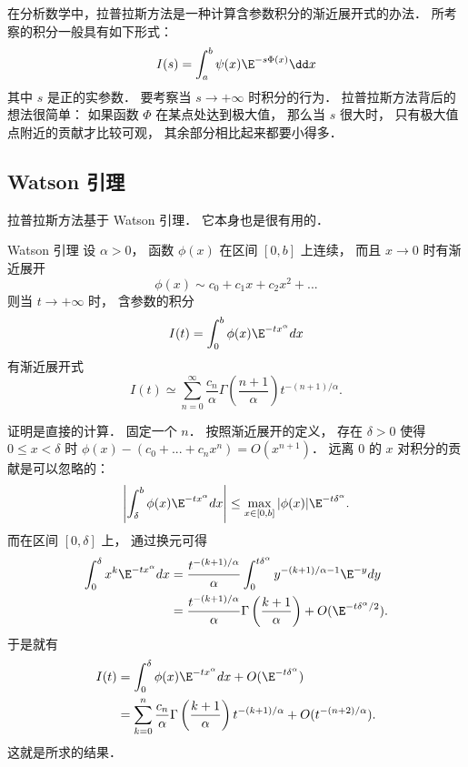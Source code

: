

在分析数学中，拉普拉斯方法是一种计算含参数积分的渐近展开式的办法． 所考察的积分一般具有如下形式：
\begin{equation}\label{LapAsm_eq1}
I(s)=\int_a^b\psi(x)\E^{-s\Phi(x)}\dd x
\end{equation}
其中 $s$ 是正的实参数． 要考察当 $s\to+\infty$ 时积分的行为． 拉普拉斯方法背后的想法很简单： 如果函数 $\Phi$ 在某点处达到极大值， 那么当 $s$ 很大时， 只有极大值点附近的贡献才比较可观， 其余部分相比起来都要小得多．

\subsection{Watson 引理}
拉普拉斯方法基于 Watson 引理． 它本身也是很有用的．

\begin{lemma}{Watson 引理}
设 $\alpha>0$， 函数 $\phi(x)$ 在区间 $[0,b]$ 上连续， 而且 $x\to0$ 时有渐近展开
\[
\phi(x)\sim c_0+c_1x+c_2x^2+...
\]
则当 $t\to+\infty$ 时， 含参数的积分
$$
I(t)=\int_0^b \phi(x)\E^{-t x^\alpha}dx
$$
有渐近展开式
$$
I(t)\simeq\sum_{n=0}^\infty \frac{c_n}{\alpha}\Gamma\left(\frac{n+1}{\alpha}\right)t^{-(n+1)/\alpha}.
$$
\end{lemma}

证明是直接的计算． 固定一个 $n$． 按照渐近展开的定义， 存在 $\delta>0$ 使得 $0\leq x<\delta$ 时 $\phi(x)-(c_0+...+c_nx^n)=O(x^{n+1})$． 远离 $0$ 的 $x$ 对积分的贡献是可以忽略的：
$$
\left|\int_\delta^b\phi(x)\E^{-tx^\alpha}dx\right|
\leq\max_{x\in[0,b]}|\phi(x)|\E^{-t\delta^\alpha}.
$$
而在区间 $[0,\delta]$ 上， 通过换元可得
$$
\begin{aligned}
\int_0^\delta x^k\E^{-tx^\alpha}dx
&=\frac{t^{-(k+1)/\alpha}}{\alpha}\int_0^{t\delta^\alpha}y^{-(k+1)/\alpha-1}\E^{-y}dy\\
&=\frac{t^{-(k+1)/\alpha}}{\alpha}\Gamma\left(\frac{k+1}{\alpha}\right)+O(\E^{-t\delta^\alpha/2}).
\end{aligned}
$$
于是就有
$$
\begin{aligned}
I(t)
&=\int_0^\delta\phi(x)\E^{-tx^\alpha}dx+O(\E^{-t\delta^\alpha})\\
&=\sum_{k=0}^n\frac{c_n}{\alpha}\Gamma\left(\frac{k+1}{\alpha}\right)t^{-(k+1)/\alpha}+O(t^{-(n+2)/\alpha}).
\end{aligned}
$$
这就是所求的结果．

